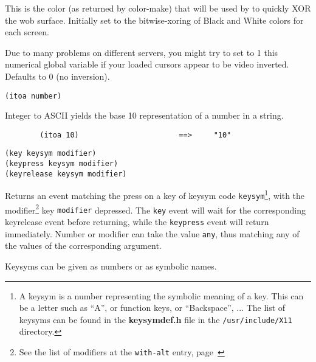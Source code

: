 
This is the color (as returned by color-make) that will be used by 
 to quickly XOR the wob surface.
Initially set to the bitwise-xoring of Black and White colors for each
screen.

        

Due to many problems on different servers, you might try to set to 1 this
numerical global variable if your loaded cursors appear to be video
inverted. Defaults to 0 (no inversion).

        
{\usagefont\begin{verbatim}
(itoa number)
\end{verbatim}}\usageupspace

Integer to ASCII yields the base 10 representation of a number in a {\WOOL}
string.

{\exemplefont\begin{verbatim}
        (itoa 10)                       ==>     "10"
\end{verbatim}}

        
{\usagefont\begin{verbatim}
(key keysym modifier)
(keypress keysym modifier)
(keyrelease keysym modifier)
\end{verbatim}}\usageupspace

Returns an event matching the press on a key of keysym code
\verb"keysym"\footnote{A keysym is a number representing the symbolic
meaning of a key. This can be a letter such as ``A'', or function keys, or
``Backspace'', ... The list of keysyms can be found in the {\bf keysymdef.h}
file in the {\tt /usr/include/X11} directory.}, with the
modifier\footnote{See the list of modifiers at the \verb"with-alt" entry,
page~\pageref{with-alt}} key {\tt modifier} depressed. The \verb"key" event
will wait for the corresponding keyrelease event before returning, while the
\verb"keypress" event will return immediately. Number or modifier can take
the value \verb"any", thus matching any of the values of the corresponding
argument.

Keysyms can be given as numbers or as symbolic names.

